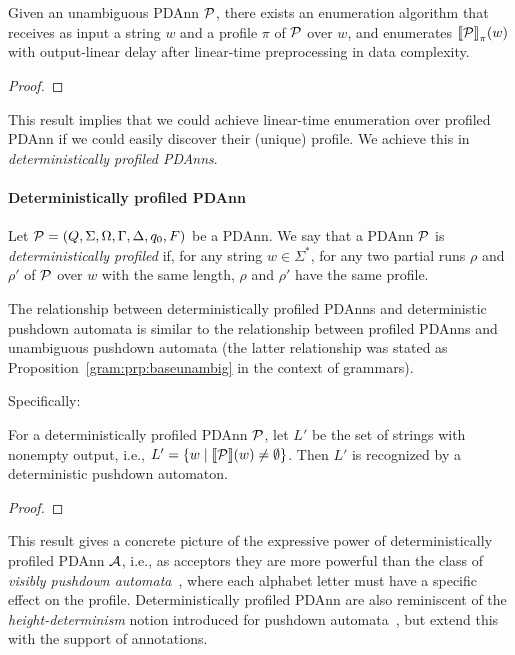 %
%
%

\begin{lemma}\label{gram:lem:vpaconv}
	Given an unambiguous PDAnn $\mathcal{P}$, there exists an enumeration algorithm
        that receives as input a string $w$ and a profile $\pi$ of $\mathcal{P}$ over
        $w$, and enumerates ${\llbracket{\mathcal{P}}\rrbracket}_{\pi}(w)$ with output-linear delay after
        linear-time preprocessing in data complexity.
\end{lemma}
\begin{proof}
  
\end{proof}

This result implies that we could achieve linear-time enumeration over profiled
PDAnn if we could easily discover their (unique) profile.
We achieve this in \emph{deterministically profiled PDAnns}.

\paragraph{Deterministically profiled PDAnn}
%
%
%
%
%
%
%
%
%
%
%
%
%
%
%
%
%
%
%
%
%
%
%
%
%
%
%
%
%
%
%
%
Let $\mathcal{P} = (Q, \Sigma, \Omega, \Gamma, \Delta, q_0, F)$ be a PDAnn. We
say that a PDAnn $\mathcal{P}$ is \emph{deterministically profiled} if, for any
string $w \in \Sigma^*$, for any two partial runs $\rho$ and
$\rho'$ of $\mathcal{P}$ over $w$ with the same length, $\rho$ and $\rho'$ have the same profile.

The relationship between deterministically profiled PDAnns and 
deterministic pushdown automata 
is similar to the relationship between 
profiled PDAnns and unambiguous pushdown automata (the latter relationship was
stated as
Proposition~\ref{gram:prp:baseunambig} in the context of grammars). 

Specifically:

\begin{proposition}
  \label{gram:prp:basedeterm}
  For a deterministically profiled PDAnn $\mathcal{P}$, let $L'$ be the set of strings with nonempty output, i.e., $L' = \{w \mid {\llbracket{\mathcal{P}}\rrbracket}(w) \not = \emptyset\} $. Then $L'$ is
  recognized by a deterministic pushdown automaton.
\end{proposition}
\begin{proof}
  
\end{proof}

%
%
%
%

This result gives a concrete picture of the expressive power of 
deterministically profiled PDAnn $\mathcal{A}$, i.e., as acceptors they are more powerful
than the class of
\emph{visibly pushdown
automata}~\cite{alur2004visibly}, where each alphabet letter must have a
specific effect on the profile. Deterministically profiled PDAnn are also
reminiscent of 
%
%
%
%
%
%
%
%
%
%
%
%
%
%
%
%
the \emph{height-determinism} notion introduced for pushdown automata~\cite{nowotka2007height}, but
extend this with the support of annotations.
%

